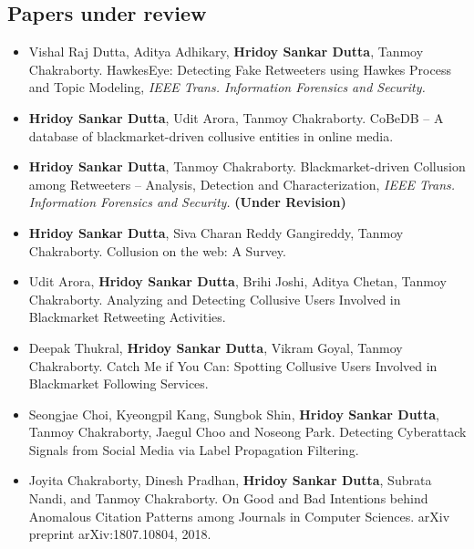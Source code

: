 \documentclass[margin, centered]{res}
\begin{document}
\begin{resume}
\section{Papers under review}
\begin{itemize}[leftmargin=*]
\item Vishal Raj Dutta, Aditya Adhikary, \textbf{Hridoy Sankar Dutta}, Tanmoy Chakraborty. HawkesEye: Detecting Fake Retweeters using Hawkes Process and Topic Modeling,  \textit{IEEE Trans. Information Forensics and Security.}

\item \textbf{Hridoy Sankar Dutta}, Udit Arora, Tanmoy Chakraborty. CoBeDB – A database of blackmarket-driven collusive entities in online media.

\item \textbf{Hridoy Sankar Dutta}, Tanmoy Chakraborty. Blackmarket-driven Collusion among Retweeters – Analysis, Detection and Characterization,  \textit{IEEE Trans. Information Forensics and Security.} \textbf{(Under Revision)}

\item \textbf{Hridoy Sankar Dutta}, Siva Charan Reddy Gangireddy, Tanmoy Chakraborty. Collusion on the web: A Survey.

\item Udit Arora, \textbf{Hridoy Sankar Dutta}, Brihi Joshi, Aditya Chetan, Tanmoy Chakraborty. Analyzing and Detecting Collusive Users Involved in Blackmarket Retweeting Activities.

\item Deepak Thukral, \textbf{Hridoy Sankar Dutta}, Vikram Goyal, Tanmoy Chakraborty. Catch Me if You Can: Spotting Collusive Users Involved in Blackmarket Following Services.

\item Seongjae Choi, Kyeongpil Kang, Sungbok Shin, \textbf{Hridoy Sankar Dutta}, Tanmoy Chakraborty, Jaegul Choo and Noseong Park. Detecting Cyberattack Signals from Social Media via Label Propagation Filtering.


\item Joyita Chakraborty, Dinesh Pradhan, \textbf{Hridoy Sankar Dutta}, Subrata Nandi, and Tanmoy Chakraborty. On Good and Bad Intentions behind Anomalous Citation Patterns among Journals in Computer Sciences. arXiv preprint arXiv:1807.10804, 2018.
\end{itemize}


\end{resume}
\end{document}
